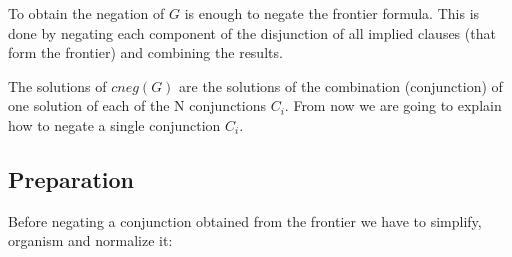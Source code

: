 \documentclass{llncs}
\begin{document}
To obtain the negation of $G$ is enough to negate the frontier
formula. This is done by negating each component of the disjunction of
all implied clauses (that form the frontier) and combining the
results.


The solutions of $cneg(G)$ are the solutions of the combination
(conjunction) of one solution of each of the N conjunctions
$C_i$. From now we are going to explain how to negate a single
conjunction $C_i$.




\subsection{Preparation}
\label{preparation}


Before negating a conjunction obtained from the frontier we have to
simplify, organism and normalize it:
\end{document}
